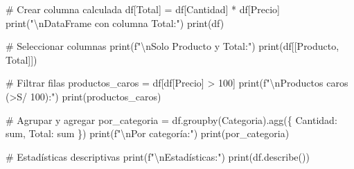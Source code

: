 \documentclass[
  doc,
  floatsintext,
  longtable,
  a4paper,
  nolmodern,
  notxfonts,
  notimes,
  12pt,
  colorlinks=true,linkcolor=blue,citecolor=blue,urlcolor=blue]{apa7}
\newenvironment{Shaded}{\begin{snugshade}}{\end{snugshade}}
\newcommand{\BuiltInTok}[1]{\textcolor[rgb]{0.00,0.23,0.31}{#1}}
\newcommand{\CharTok}[1]{\textcolor[rgb]{0.13,0.47,0.30}{#1}}
\newcommand{\CommentTok}[1]{\textcolor[rgb]{0.37,0.37,0.37}{#1}}
\newcommand{\DecValTok}[1]{\textcolor[rgb]{0.68,0.00,0.00}{#1}}
\newcommand{\NormalTok}[1]{\textcolor[rgb]{0.00,0.23,0.31}{#1}}
\newcommand{\OperatorTok}[1]{\textcolor[rgb]{0.37,0.37,0.37}{#1}}
\newcommand{\SpecialStringTok}[1]{\textcolor[rgb]{0.13,0.47,0.30}{#1}}
\newcommand{\StringTok}[1]{\textcolor[rgb]{0.13,0.47,0.30}{#1}}
\begin{document}
\begin{Shaded}
\begin{Highlighting}[]
\CommentTok{\# Crear columna calculada}
\NormalTok{df[}\StringTok{\textquotesingle{}Total\textquotesingle{}}\NormalTok{] }\OperatorTok{=}\NormalTok{ df[}\StringTok{\textquotesingle{}Cantidad\textquotesingle{}}\NormalTok{] }\OperatorTok{*}\NormalTok{ df[}\StringTok{\textquotesingle{}Precio\textquotesingle{}}\NormalTok{]}
\BuiltInTok{print}\NormalTok{(}\StringTok{"}\CharTok{\textbackslash{}n}\StringTok{DataFrame con columna Total:"}\NormalTok{)}
\BuiltInTok{print}\NormalTok{(df)}

\CommentTok{\# Seleccionar columnas}
\BuiltInTok{print}\NormalTok{(}\SpecialStringTok{f"}\CharTok{\textbackslash{}n}\SpecialStringTok{Solo Producto y Total:"}\NormalTok{)}
\BuiltInTok{print}\NormalTok{(df[[}\StringTok{\textquotesingle{}Producto\textquotesingle{}}\NormalTok{, }\StringTok{\textquotesingle{}Total\textquotesingle{}}\NormalTok{]])}

\CommentTok{\# Filtrar filas}
\NormalTok{productos\_caros }\OperatorTok{=}\NormalTok{ df[df[}\StringTok{\textquotesingle{}Precio\textquotesingle{}}\NormalTok{] }\OperatorTok{\textgreater{}} \DecValTok{100}\NormalTok{]}
\BuiltInTok{print}\NormalTok{(}\SpecialStringTok{f"}\CharTok{\textbackslash{}n}\SpecialStringTok{Productos caros (\textgreater{}S/ 100):"}\NormalTok{)}
\BuiltInTok{print}\NormalTok{(productos\_caros)}

\CommentTok{\# Agrupar y agregar}
\NormalTok{por\_categoria }\OperatorTok{=}\NormalTok{ df.groupby(}\StringTok{\textquotesingle{}Categoria\textquotesingle{}}\NormalTok{).agg(\{}
    \StringTok{\textquotesingle{}Cantidad\textquotesingle{}}\NormalTok{: }\StringTok{\textquotesingle{}sum\textquotesingle{}}\NormalTok{,}
    \StringTok{\textquotesingle{}Total\textquotesingle{}}\NormalTok{: }\StringTok{\textquotesingle{}sum\textquotesingle{}}
\NormalTok{\})}
\BuiltInTok{print}\NormalTok{(}\SpecialStringTok{f"}\CharTok{\textbackslash{}n}\SpecialStringTok{Por categoría:"}\NormalTok{)}
\BuiltInTok{print}\NormalTok{(por\_categoria)}

\CommentTok{\# Estadísticas descriptivas}
\BuiltInTok{print}\NormalTok{(}\SpecialStringTok{f"}\CharTok{\textbackslash{}n}\SpecialStringTok{Estadísticas:"}\NormalTok{)}
\BuiltInTok{print}\NormalTok{(df.describe())}
\end{Highlighting}
\end{Shaded}
\end{document}
